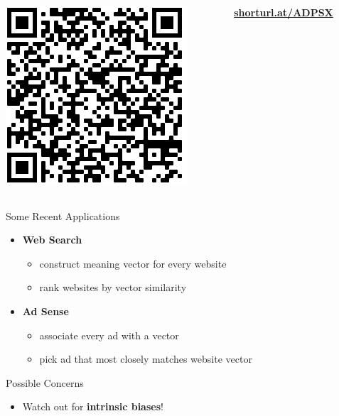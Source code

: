 \documentclass[professionalfonts, xcolor={usenames,svgnames,x11names,table}]{beamer}
\begin{document}
\begin{frame}[plain]
    \begin{center}
    \end{center}
    \vspace{1cm}
    \begin{columns}
\begin{column}{0.5\textwidth}
\centering
    \includegraphics[width=0.5\linewidth]{img/QR_tutorial.png}
    \end{column}
    \begin{column}{0.5\textwidth}
    \centering
    \href{shorturl.at/ADPSX}{\large{\alert{\textbf{shorturl.at/ADPSX}}}}
        \end{column}
            \end{columns}
\end{frame}


\begin{frame}{Some Recent Applications}
    \begin{itemize}
        \item \textbf{Web Search}
            \begin{itemize}
                \item construct meaning vector for every website
                \item rank websites by vector similarity
            \end{itemize}
        \item \textbf{Ad Sense}
            \begin{itemize}
                \item associate every ad with a vector
                \item pick ad that most closely matches website vector
            \end{itemize}
    \end{itemize}

    \begin{block}{Possible Concerns}
 \begin{itemize}
                    \item Watch out for \alert{\textbf{intrinsic biases}!}
            \end{itemize}
    \end{block}
\end{frame}
\end{document}
